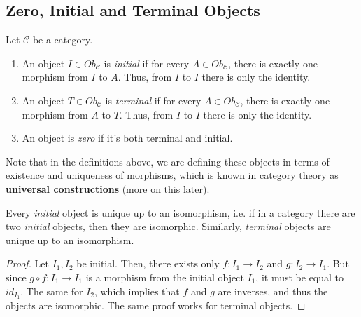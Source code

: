 \subsection{Zero, Initial and Terminal Objects}

\begin{definition}
  Let $\mathcal C$ be a category.
  \begin{enumerate}[1.]
    \item An object $I \in Ob_\mathcal C$ is \textit{initial} if for every $A \in Ob_\mathcal C$,
      there is exactly one morphism from $I$ to $A$. Thus, from $I$ to $I$ there is only the identity.
    \item An object $T \in Ob_\mathcal C$ is \textit{terminal} if for every $A \in Ob_\mathcal C$,
      there is exactly one morphism from $A$ to $T$. Thus, from $I$ to $I$ there is only the identity.
    \item An object is \textit{zero} if it's both terminal and initial.
  \end{enumerate}
\end{definition}

Note that in the definitions above, we are defining these objects in terms of existence and
uniqueness of morphisms, which is known in category theory as \textbf{universal constructions}
(more on this later).

\begin{theorem}
  Every \textit{initial} object is unique up to an isomorphism, i.e. if in a category there 
  are two \textit{initial} objects, then they are isomorphic.
  Similarly, \textit{terminal} objects are unique up to an isomorphism.
\end{theorem}
\begin{proof}
  Let $I_1, I_2$ be initial. Then, there exists only $f:I_1 \to I_2$ and $g:I_2 \to I_1$.
  But since $g \circ f:I_1 \to I_1$ is a morphism from the initial object $I_1$, it must
  be equal to $id_{I_1}$. The same for $I_2$, which implies that $f$ and $g$ are inverses,
  and thus the objects are isomorphic.
  The same proof works for terminal objects.
\end{proof}


